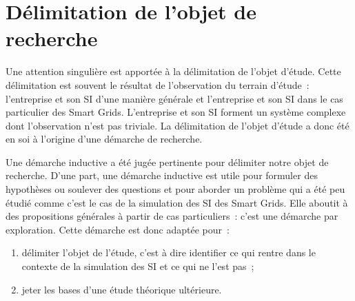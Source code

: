 %


	\section{Délimitation de l'objet de recherche}
		
	Une attention singulière est apportée à la délimitation de l'objet d'étude. 
Cette délimitation est souvent le résultat de l'observation du terrain d'étude~: 
l'entreprise et son SI d'une manière générale et l'entreprise et son SI dans le 
cas particulier des Smart Grids. L'entreprise et son SI forment un système 
complexe dont l'observation n'est pas triviale. La délimitation de l'objet 
d'étude a donc été en soi à l'origine d'une démarche de recherche.
	
	Une démarche inductive a été jugée pertinente pour délimiter notre objet de recherche. D'une part, une démarche inductive est utile pour formuler des hypothèses ou soulever des questions et pour aborder 
un problème qui a été peu étudié comme c'est le cas de la simulation des SI des Smart Grids. 
Elle aboutit à des propositions générales à partir de cas particuliers~: c'est 
une démarche par exploration. 
	Cette démarche est donc adaptée pour~: 
	\begin{enumerate}
	\item délimiter l'objet de l'étude, c'est à dire identifier ce qui rentre dans le 
contexte de la simulation des SI et ce qui ne l'est pas~;
	\item jeter les bases d'une étude théorique ultérieure.
	\end{enumerate}
	
